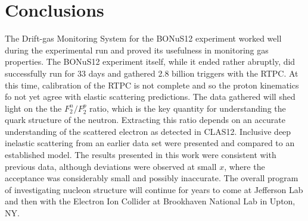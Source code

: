 \newpage
\section{Conclusions}
The Drift-gas Monitoring System for the BONuS12 experiment worked well during the experimental run and proved its usefulness in monitoring gas properties. The BONuS12 experiment itself, while it ended rather abruptly, did successfully run for 33 days and gathered 2.8 billion triggers with the RTPC. At this time, calibration of the RTPC is not complete and so the proton kinematics fo not yet agree with elastic scattering predictions. The data gathered will shed light on the the $F_2^n/F_2^p$ ratio, which is the key quantity for understanding the quark structure of the neutron. Extracting this ratio depends on an accurate understanding of the scattered electron as detected in CLAS12. Inclusive deep inelastic scattering from an earlier data set were presented and compared to an established model. The results presented in this work were consistent with previous data, although deviations were observed at small $x$, where the acceptance was considerably small and possibly inaccurate. The overall program of investigating nucleon structure will continue for years to come at Jefferson Lab and then with the Electron Ion Collider at Brookhaven National Lab in Upton, NY.
